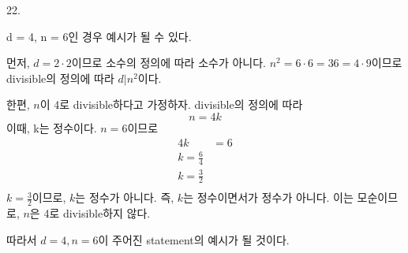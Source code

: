 \documentclass{article}
\begin{document}
22.
\begin{addmargin}[1em]{2em}
d = 4, n = 6인 경우 예시가 될 수 있다.
\newline

먼저, $d = 2\cdot 2$이므로 소수의 정의에 따라 소수가 아니다. 
$n^2=6\cdot 6 = 36 = 4 \cdot 9$이므로 divisible의 정의에 따라 $d|n^2$이다.
\newline

한편, $n$이 4로 divisible하다고 가정하자. divisible의 정의에 따라
\[n=4k\]
이때, k는 정수이다. $n=6$이므로
\begin{align*}
    4k &= 6 \\
    k = \frac{6}{4} \\
    k = \frac{3}{2} \\
\end{align*}
$k = \frac{3}{2}$이므로, $k$는 정수가 아니다. 즉, $k$는 정수이면서가 정수가 아니다. 이는 모순이므로, $n$은 4로 divisible하지 않다.
\newline

따라서 $d=4, n=6$이 주어진 statement의 예시가 될 것이다.
\end{addmargin}
\bigskip
\end{document}

